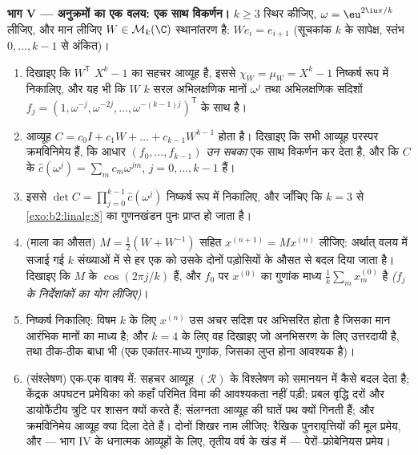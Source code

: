 \begin{problem}[{सप्ताहांत समस्या --- रैखिक पुनरावृत्तियों की
मूल प्रमेय}]
\medskip
\noindent\textbf{भाग V --- अनुक्रमों का एक वलय: एक साथ विकर्णन।} $k \geq 3$
स्थिर कीजिए, $\omega = \eu^{2\iu\pi/k}$ लीजिए, और मान लीजिए $W \in \mathcal{M}_k(\C)$  स्थानांतरण है: $W e_i =
e_{i+1}$
(सूचकांक $k$ के सापेक्ष, स्तंभ $0, \dots, k-1$ से अंकित)।
\begin{enumerate}[resume]
  \item दिखाइए कि $W^{\mathsf T}$ $X^k - 1$ का सहचर आव्यूह है, इससे $\chi_W = \mu_W = X^k - 1$ निष्कर्ष रूप में
        निकालिए, और यह भी कि $W$ $k$ सरल अभिलक्षणिक मानों $\omega^j$ तथा
        अभिलक्षणिक सदिशों $f_j = (1, \omega^{-j},
        \omega^{-2j}, \dots, \omega^{-(k-1)j})^{\mathsf T}$ के साथ  है।
  \item \emph{} आव्यूह $C = c_0 I + c_1 W + \dots
        + c_{k-1}W^{k-1}$ होता है। दिखाइए कि सभी  आव्यूह
        परस्पर क्रमविनिमेय हैं, कि आधार $(f_0, \dots, f_{k-1})$ \emph{उन सबका} एक साथ
        विकर्णन कर देता है, और कि $C$ के  $\widehat c(\omega^j) = \sum_m
        c_m \omega^{jm}$, $j = 0, \dots, k-1$
        हैं।
  \item इससे $\det C = \prod_{j=0}^{k-1} \widehat
        c(\omega^j)$ निष्कर्ष रूप में निकालिए, और जाँचिए कि $k = 3$ से \cref{exo:b2:linalg:8}
        का गुणनखंडन पुनः प्राप्त हो जाता है।
  \item (माला का औसत) $M = \frac12(W + W^{-1})$ सहित $x^{(n+1)} = Mx^{(n)}$ लीजिए: अर्थात् वलय में सजाई गई
        $k$ संख्याओं में से हर एक को उसके दोनों पड़ोसियों के औसत से
        बदल दिया जाता है। दिखाइए कि $M$ के  $\cos(2\pi j/k)$ हैं,
        और $f_0$ पर $x^{(0)}$ का गुणांक माध्य $\frac1k\sum_m x^{(0)}_m$ है \emph{($f_j$ के
        निर्देशांकों का योग लीजिए)}।
  \item निष्कर्ष निकालिए: विषम $k$ के लिए $x^{(n)}$ उस अचर सदिश पर अभिसरित
        होता है जिसका मान आरंभिक मानों का माध्य है; और $k = 4$ के लिए वह
         दिखाइए जो अनभिसरण के लिए उत्तरदायी है, तथा
        ठीक-ठीक बाधा भी (एक एकांतर-माध्य गुणांक, जिसका लुप्त होना
        आवश्यक है)।
  \item (संश्लेषण) एक-एक वाक्य में: सहचर आव्यूह $(\mathcal R)$ के विश्लेषण को
        समानयन में कैसे बदल देता है; केंद्रक अपघटन प्रमेयिका को कहाँ
        परिमित विमा की आवश्यकता नहीं पड़ी; प्रबल  वृद्धि
        दरों और डायोफैंटीय त्रुटि पर शासन क्यों करते हैं; संलग्नता
        आव्यूह की घातें पथ क्यों गिनती हैं; और क्रमविनिमेय आव्यूह क्या
        दिला देते हैं। दोनों शिखर नाम लीजिए: रैखिक पुनरावृत्तियों की
        मूल प्रमेय, और --- भाग IV के धनात्मक आव्यूहों के लिए, तृतीय
        वर्ष के खंड में --- पेरों--फ्रोबेनियस प्रमेय।
\end{enumerate}
\end{problem}
